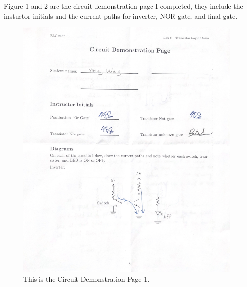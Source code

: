 \documentclass[11pt]{article}
\begin{document}
		Figure 1 and 2 are the circuit demonstration page I completed, they include the instuctor initials and the current paths for inverter, NOR gate, and final gate.\\
	\begin{figure}[ht]\centering
		\includegraphics[width=1.0\textwidth]{Lab2Page1}
		\caption{This is the Circuit Demonstration Page 1.}
		\label{fig:original_logo}
	\end{figure}
	
\end{document}
